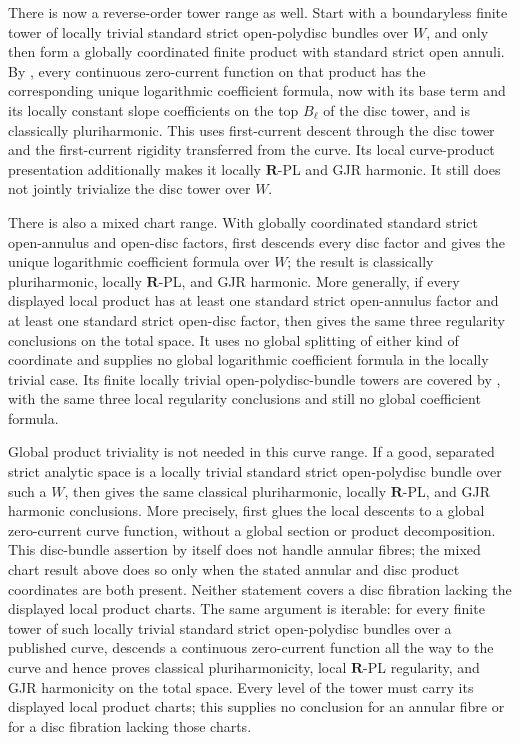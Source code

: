 There is now a reverse-order tower range as well.  Start with a
boundaryless finite tower of locally trivial standard strict open-polydisc
bundles over \(W\), and only then form a globally coordinated finite product
with standard strict open annuli.  By
, every
continuous zero-current function on that product has the corresponding
unique logarithmic coefficient formula, now with its base term and its
locally constant slope coefficients on the top \(B_\ell\) of the disc
tower, and is classically pluriharmonic.  This uses first-current descent
through the disc tower and the first-current rigidity transferred from the
curve.  Its local curve-product presentation additionally makes it locally
\(\mathbf R\)-PL and GJR harmonic.  It still does not jointly trivialize
the disc tower over \(W\).

There is also a mixed chart range.  With globally coordinated standard
strict open-annulus and open-disc factors,
 first descends every
disc factor and gives the unique logarithmic coefficient formula over \(W\);
the result is classically pluriharmonic, locally \(\mathbf R\)-PL, and GJR
harmonic.  More generally, if every displayed local product has at least one
standard strict open-annulus factor and at least one standard strict
open-disc factor, then
 gives the same
three regularity conclusions on the total space.  It uses no global splitting
of either kind of coordinate and supplies no global logarithmic coefficient
formula in the locally trivial case.  Its finite locally trivial
open-polydisc-bundle towers are covered by
, with
the same three local regularity conclusions and still no global coefficient
formula.

Global product triviality is not needed in this curve range.  If a good,
separated strict analytic space is a locally trivial standard strict
open-polydisc bundle over such a \(W\), then
 gives the same classical
pluriharmonic, locally \(\mathbf R\)-PL, and GJR harmonic conclusions.  More precisely,
 first glues the local descents
to a global zero-current curve function, without a global section or product
decomposition.  This disc-bundle assertion by itself does not handle annular
fibres; the mixed chart result above does so only when the stated annular
and disc product coordinates are both present.  Neither statement covers a
disc fibration lacking the displayed local product charts.
The same argument is iterable: for every finite tower of such locally
trivial standard strict open-polydisc bundles over a published curve,
 descends a
continuous zero-current function all the way to the curve and hence proves
classical pluriharmonicity, local \(\mathbf R\)-PL regularity, and GJR
harmonicity on the total space.  Every level of the tower must carry its
displayed local product charts; this supplies no conclusion for an annular
fibre or for a disc fibration lacking those charts.

